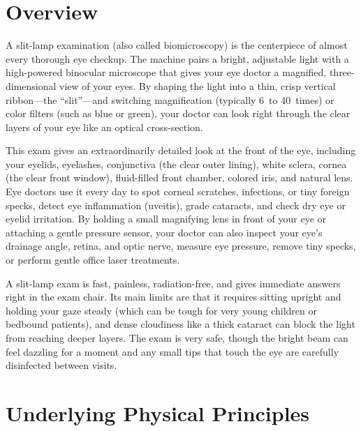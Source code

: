 \label{ch:infographic-slit-lamp}

\section{Overview}

A slit-lamp examination (also called biomicroscopy) is the centerpiece of almost every thorough eye checkup. The machine pairs a bright, adjustable light with a high-powered binocular microscope that gives your eye doctor a magnified, three-dimensional view of your eyes. By shaping the light into a thin, crisp vertical ribbon---the ``slit''---and switching magnification (typically 6~to 40~times) or color filters (such as blue or green), your doctor can look right through the clear layers of your eye like an optical cross-section.

This exam gives an extraordinarily detailed look at the front of the eye, including your eyelids, eyelashes, conjunctiva (the clear outer lining), white sclera, cornea (the clear front window), fluid-filled front chamber, colored iris, and natural lens. Eye doctors use it every day to spot corneal scratches, infections, or tiny foreign specks, detect eye inflammation (uveitis), grade cataracts, and check dry eye or eyelid irritation. By holding a small magnifying lens in front of your eye or attaching a gentle pressure sensor, your doctor can also inspect your eye's drainage angle, retina, and optic nerve, measure eye pressure, remove tiny specks, or perform gentle office laser treatments.

A slit-lamp exam is fast, painless, radiation-free, and gives immediate answers right in the exam chair. Its main limits are that it requires sitting upright and holding your gaze steady (which can be tough for very young children or bedbound patients), and dense cloudiness like a thick cataract can block the light from reaching deeper layers. The exam is very safe, though the bright beam can feel dazzling for a moment and any small tips that touch the eye are carefully disinfected between visits.

\section{Underlying Physical Principles}

